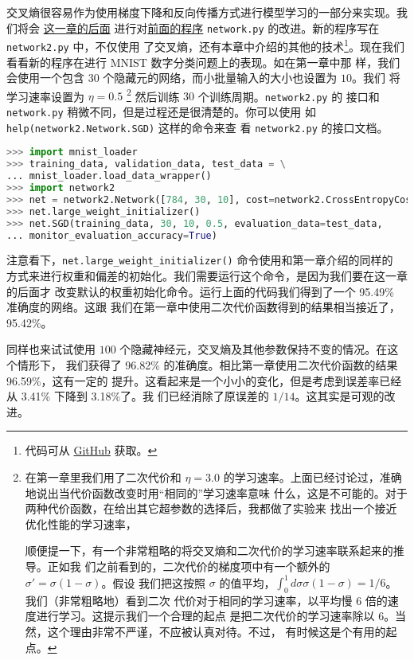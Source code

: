 交叉熵很容易作为使用梯度下降和反向传播方式进行模型学习的一部分来实现。我们将会%
\hyperref[sec:handwriting_recognition_revisited_the_code]{这一章的后面}%
进行对\hyperref[sec:implementing_our_network_to_classify_digits]{前面的程序}
\lstinline!network.py! 的改进。新的程序写在 \lstinline!network2.py!  中，不仅使用
了交叉熵，还有本章中介绍的其他的技术\footnote{代码可从%
  \href{https://github.com/mnielsen/neural-networks-and-deep-learning/blob/master/src/network2.py}{GitHub}
  获取。}。现在我们看看新的程序在进行 MNIST 数字分类问题上的表现。如在第一章中那
样，我们会使用一个包含 $30$ 个隐藏元的网络，而小批量输入的大小也设置为 $10$。我们
将学习速率设置为 $\eta=0.5$ \footnote{ 在第一章里我们用了二次代价和 $\eta = 3.0$
  的学习速率。上面已经讨论过，准确地说出当代价函数改变时用``相同的''学习速率意味
  什么，这是不可能的。对于两种代价函数，在给出其它超参数的选择后，我都做了实验来
  找出一个接近优化性能的学习速率，

  顺便提一下，有一个非常粗略的将交叉熵和二次代价的学习速率联系起来的推导。正如我
  们之前看到的，二次代价的梯度项中有一个额外的 $\sigma' = \sigma(1-\sigma)$。假设
  我们把这按照 $\sigma$
  的值平均，$\int_0^1 d\sigma \sigma(1-\sigma) = 1/6$。我们（非常粗略地）看到二次
  代价对于相同的学习速率，以平均慢 $6$ 倍的速度进行学习。这提示我们一个合理的起点
  是把二次代价的学习速率除以 $6$。当然，这个理由非常不严谨，不应被认真对待。不过，
  有时候这是个有用的起点。} 然后训练 $30$ 个训练周期。\lstinline!network2.py! 的
接口和 \lstinline!network.py! 稍微不同，但是过程还是很清楚的。你可以使用
如 \lstinline!help(network2.Network.SGD)! 这样的命令来查
看 \lstinline!network2.py! 的接口文档。

\begin{lstlisting}[language=Python]
>>> import mnist_loader
>>> training_data, validation_data, test_data = \
... mnist_loader.load_data_wrapper()
>>> import network2
>>> net = network2.Network([784, 30, 10], cost=network2.CrossEntropyCost)
>>> net.large_weight_initializer()
>>> net.SGD(training_data, 30, 10, 0.5, evaluation_data=test_data,
... monitor_evaluation_accuracy=True)
\end{lstlisting}

注意看下，\lstinline!net.large_weight_initializer()! 命令使用和第一章介绍的同样的
方式来进行权重和偏差的初始化。我们需要运行这个命令，是因为我们要在这一章的后面才
改变默认的权重初始化命令。运行上面的代码我们得到了一个 95.49\% 准确度的网络。这跟
我们在第一章中使用二次代价函数得到的结果相当接近了，95.42\%。

同样也来试试使用 $100$ 个隐藏神经元，交叉熵及其他参数保持不变的情况。在这个情形下，
我们获得了 96.82\% 的准确度。相比第一章使用二次代价函数的结果 96.59\%，这有一定的
提升。这看起来是一个小小的变化，但是考虑到误差率已经从 3.41\% 下降到 3.18\%了。我
们已经消除了原误差的 $1/14$。这其实是可观的改进。

